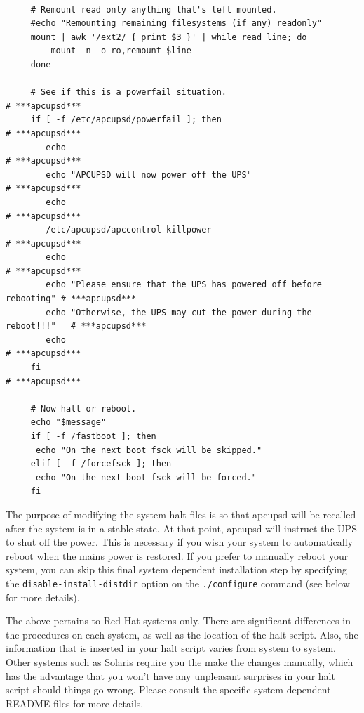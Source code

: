 \footnotesize
\begin{verbatim}
     
     # Remount read only anything that's left mounted.
     #echo "Remounting remaining filesystems (if any) readonly"
     mount | awk '/ext2/ { print $3 }' | while read line; do
         mount -n -o ro,remount $line
     done
     
     # See if this is a powerfail situation.                               # ***apcupsd***
     if [ -f /etc/apcupsd/powerfail ]; then                                # ***apcupsd***
        echo                                                               # ***apcupsd***
        echo "APCUPSD will now power off the UPS"                          # ***apcupsd***
        echo                                                               # ***apcupsd***
        /etc/apcupsd/apccontrol killpower                                  # ***apcupsd***
        echo                                                               # ***apcupsd***
        echo "Please ensure that the UPS has powered off before rebooting" # ***apcupsd***
        echo "Otherwise, the UPS may cut the power during the reboot!!!"   # ***apcupsd***
        echo                                                               # ***apcupsd***
     fi                                                                    # ***apcupsd***
     
     # Now halt or reboot.
     echo "$message"
     if [ -f /fastboot ]; then
      echo "On the next boot fsck will be skipped."
     elif [ -f /forcefsck ]; then
      echo "On the next boot fsck will be forced."
     fi
\end{verbatim}
\normalsize

The purpose of modifying the system halt files is so that apcupsd will be
recalled after the system is in a stable state. At that point, apcupsd will
instruct the UPS to shut off the power. This is necessary if you wish your
system to automatically reboot when the mains power is restored. If you prefer
to manually reboot your system, you can skip this final system dependent
installation step by specifying the {\tt disable-install-distdir} option on
the {\tt ./configure} command (see below for more details).  

The above pertains to Red Hat systems only. There are significant differences
in the procedures on each system, as well as the location of the halt script.
Also, the information that is inserted in your halt script varies from system
to system. Other systems such as Solaris require you the make the changes
manually, which has the advantage that you won't have any unpleasant surprises
in your halt script should things go wrong. Please consult the specific system
dependent README files for more details.  

